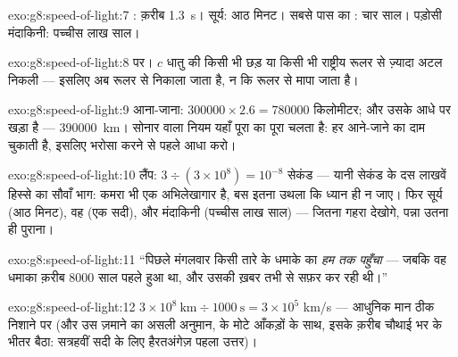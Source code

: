 \begin{solution}{exo:g8:speed-of-light:7}
: क़रीब \qty{1.3}{s}। सूर्य: आठ मिनट। सबसे पास का : चार
साल। पड़ोसी मंदाकिनी: पच्चीस लाख साल।
\end{solution}

\begin{solution}{exo:g8:speed-of-light:8}
 पर।  $c$ धातु की किसी भी छड़ या किसी भी राष्ट्रीय रूलर से
ज़्यादा अटल निकली --- इसलिए अब रूलर  से निकाला जाता है, न कि
 रूलर से मापा जाता है।
\end{solution}

\begin{solution}{exo:g8:speed-of-light:9}
आना-जाना: $300000 \times 2.6 = 780000$ किलोमीटर; और  उसके आधे
पर खड़ा है --- \qty{390000}{km}। सोनार वाला नियम यहाँ पूरा का पूरा
चलता है: हर  आने-जाने का दाम चुकाती है, इसलिए भरोसा करने से
पहले आधा करो।
\end{solution}

\begin{solution}{exo:g8:speed-of-light:10}
लैंप: $3 \div (3 \times 10^{8}) = 10^{-8}$ सेकंड --- यानी सेकंड के दस
लाखवें हिस्से का सौवाँ भाग: कमरा भी एक अभिलेखागार है, बस इतना उथला कि
ध्यान ही न जाए। फिर सूर्य (आठ मिनट), वह  (एक सदी), और मंदाकिनी
(पच्चीस लाख साल) --- जितना गहरा देखोगे, पन्ना उतना ही पुराना।
\end{solution}

\begin{solution}{exo:g8:speed-of-light:11}
``पिछले मंगलवार किसी तारे के धमाके का  \emph{हम तक पहुँचा} ---
जबकि वह धमाका क़रीब $8000$ साल पहले हुआ था, और उसकी ख़बर तभी से सफ़र
कर रही थी।''
\end{solution}

\begin{solution}{exo:g8:speed-of-light:12}
$3 \times 10^{8}\ \text{km} \div 1000\ \text{s} = 3 \times 10^{5}$
\unit{km/s} --- आधुनिक मान ठीक निशाने पर (और उस ज़माने का असली
अनुमान,  के मोटे आँकड़ों के साथ, इसके क़रीब चौथाई भर के भीतर बैठा:
सत्रहवीं सदी के लिए हैरतअंगेज़ पहला उत्तर)।
\end{solution}

